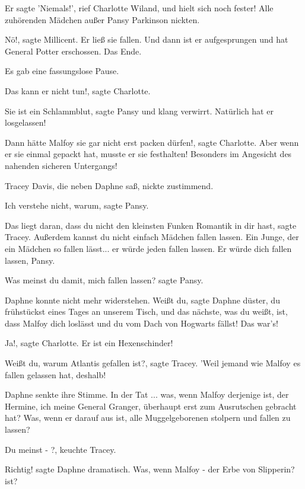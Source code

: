 \glqq{}Er sagte 'Niemals!'\grqq{}, rief Charlotte Wiland, \glqq{}und hielt sich
noch fester! Alle zuhörenden Mädchen außer Pansy Parkinson nickten.\grqq{}

Nö!\grqq{}, sagte Millicent. \glqq{}Er ließ sie fallen. Und dann ist er
aufgesprungen und hat General Potter erschossen. Das Ende.\grqq{}

Es gab eine fassungslose Pause.

\glqq{}Das kann er nicht tun!\grqq{}, sagte Charlotte.

\glqq{}Sie ist ein Schlammblut\grqq{}, sagte Pansy und klang verwirrt. \glqq{}
Natürlich hat er losgelassen!\grqq{}

\glqq{}Dann hätte Malfoy sie gar nicht erst packen dürfen!\grqq{}, sagte
Charlotte. \glqq{}Aber wenn er sie einmal gepackt hat, musste er sie festhalten!
Besonders im Angesicht des nahenden sicheren Untergangs!\grqq{}

Tracey Davis, die neben Daphne saß, nickte zustimmend.

\glqq{}Ich verstehe nicht, warum\grqq{}, sagte Pansy.

\glqq{}Das liegt daran, dass du nicht den kleinsten Funken Romantik in dir
hast\grqq{}, sagte Tracey. \glqq{}Außerdem kannst du nicht einfach Mädchen fallen
lassen. Ein Junge, der ein Mädchen so fallen lässt... er würde jeden fallen
lassen. Er würde dich fallen lassen, Pansy.\grqq{}

\glqq{}Was meinst du damit, mich fallen lassen?\grqq{} sagte Pansy.

Daphne konnte nicht mehr widerstehen. \glqq{}Weißt du\grqq{}, sagte Daphne
düster, \glqq{}du frühstückst eines Tages an unserem Tisch, und das nächste, was
du weißt, ist, dass Malfoy dich loslässt und du vom Dach von Hogwarts fällst!
Das war's!\grqq{}

\glqq{}Ja!\grqq{}, sagte Charlotte. \glqq{}Er ist ein Hexenschinder!\grqq{}

\glqq{}Weißt du, warum Atlantis gefallen ist?\grqq{}, sagte Tracey. \glqq{}'Weil
jemand wie Malfoy es fallen gelassen hat, deshalb!\grqq{}

Daphne senkte ihre Stimme. \glqq{}In der Tat ... was, wenn Malfoy derjenige ist,
der Hermine, ich meine General Granger, überhaupt erst zum Ausrutschen gebracht
hat? Was, wenn er darauf aus ist, alle Muggelgeborenen stolpern und fallen zu
lassen?\grqq{}

\glqq{}Du meinst - ?\grqq{}, keuchte Tracey.

\glqq{}Richtig!\grqq{} sagte Daphne dramatisch. \glqq{}Was, wenn Malfoy - der Erbe
von Slipperin? ist?\grqq{}

